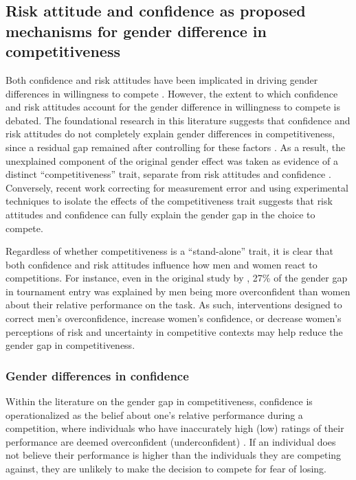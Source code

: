 \documentclass[a4paper, nobind]{templates/ociamthesis}
\begin{document}
\hypertarget{risk-attitude-and-confidence-as-proposed-mechanisms-for-gender-difference-in-competitiveness}{%
\subsection{Risk attitude and confidence as proposed mechanisms for gender difference in competitiveness}\label{risk-attitude-and-confidence-as-proposed-mechanisms-for-gender-difference-in-competitiveness}}

Both confidence and risk attitudes have been implicated in driving gender differences in willingness to compete \autocite{Niederle2011,Veldhuizen2017}. However, the extent to which confidence and risk attitudes account for the gender difference in willingness to compete is debated. The foundational research in this literature suggests that confidence and risk attitudes do not completely explain gender differences in competitiveness, since a residual gap remained after controlling for these factors \autocite{Niederle2007}. As a result, the unexplained component of the original gender effect was taken as evidence of a distinct ``competitiveness'' trait, separate from risk attitudes and confidence \autocite{Niederle2007,Niederle2011}. Conversely, recent work correcting for measurement error \autocite{Gillen2019} and using experimental techniques to isolate the effects of the competitiveness trait \autocite{Veldhuizen2017} suggests that risk attitudes and confidence can fully explain the gender gap in the choice to compete.

Regardless of whether competitiveness is a ``stand-alone'' trait, it is clear that both confidence and risk attitudes influence how men and women react to competitions. For instance, even in the original study by \textcite{Niederle2007}, 27\% of the gender gap in tournament entry was explained by men being more overconfident than women about their relative performance on the task. As such, interventions designed to correct men's overconfidence, increase women's confidence, or decrease women's perceptions of risk and uncertainty in competitive contexts may help reduce the gender gap in competitiveness.

\hypertarget{gender-differences-in-confidence}{%
\subsubsection{Gender differences in confidence}\label{gender-differences-in-confidence}}

Within the literature on the gender gap in competitiveness, confidence is operationalized as the belief about one's relative performance during a competition, where individuals who have inaccurately high (low) ratings of their performance are deemed overconfident (underconfident) \autocites{Niederle2011}[also see overplacement in][]{Moore2008,Moore2017}. If an individual does not believe their performance is higher than the individuals they are competing against, they are unlikely to make the decision to compete for fear of losing.
\end{document}

